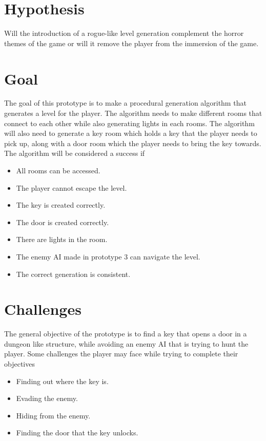 \documentclass{article}
\begin{document}
\section*{Hypothesis}
Will the introduction of a rogue-like level generation complement the horror themes of the game
or will it remove the player from the immersion of the game.

\section*{Goal}
The goal of this prototype is to make a procedural generation algorithm that generates a 
level for the player. 
The algorithm needs to make different rooms that connect to each other while also generating
lights in each rooms. The algorithm will also need to generate a key room which holds a key that
the player needs to pick up, along with a door room which the player needs to bring the key towards.
The algorithm will be considered a success if 
\begin{itemize}
    \item All rooms can be accessed.
    \item The player cannot escape the level.
    \item The key is created correctly.
    \item The door is created correctly.
    \item There are lights in the room.
    \item The enemy AI made in prototype 3 can navigate the level.
    \item The correct generation is consistent.
\end{itemize}

\section*{Challenges}
The general objective of the prototype is to find a key that opens a door in a dungeon like structure, 
while avoiding an enemy AI that is trying to hunt the player.
Some challenges the player may face while trying to complete their objectives
\begin{itemize}
    \item Finding out where the key is.
    \item Evading the enemy.
    \item Hiding from the enemy.
    \item Finding the door that the key unlocks.
\end{itemize}
\end{document}
